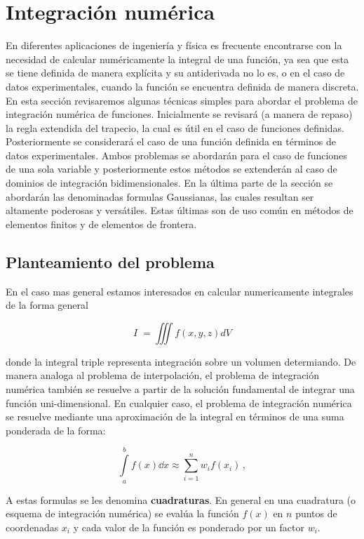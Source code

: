 \section{Integración numérica}
En diferentes aplicaciones de ingeniería y física es frecuente encontrarse con la necesidad de calcular numéricamente la integral de una función, ya sea que 
esta se tiene definida de manera explícita y su antiderivada no lo es, o en el caso de datos experimentales, cuando la función se encuentra definida de manera 
discreta.  En esta sección revisaremos algunas técnicas simples para abordar el problema de integración numérica de funciones. Inicialmente se revisará (a manera de repaso) la regla extendida del trapecio, la cual es  útil en el caso de funciones definidas. Posteriormente se considerará el caso de una función definida en términos de datos experimentales. Ambos problemas se abordarán para el caso de funciones de una sola variable y posteriormente estos métodos se extenderán al caso de dominios de integración bidimensionales. En la última parte de la sección se abordarán las denominadas formulas Gaussianas, las cuales resultan ser altamente poderosas y versátiles. Estas últimas son de uso común en métodos de elementos finitos y de elementos de frontera.

\subsection{Planteamiento del problema}
En el caso mas general estamos interesados en calcular numericamente integrales de la forma general

\begin{equation}
I\;=\iiint f(x,y,z)dV
\label{sample integral 2}
\end{equation}

donde la integral triple representa integración sobre un volumen determiando. De manera analoga al problema de interpolación, el problema de integración numérica también se resuelve a partir de la solución fundamental de integrar una función uni-dimensional. En cualquier caso, el problema de integración numérica se resuelve mediante una aproximación de la integral en términos de una suma ponderada de la forma:

\begin{equation}
\int\limits_a^b f(x) \dd{x}  \approx \sum\limits_{i=1}^n w_i f(x_i)\, ,
\label{eq:quadra}
\end{equation}

A estas formulas se les denomina {\bf cuadraturas}. En general en una cuadratura (o esquema de integración numérica) se evalúa la función $f(x)$ en $n$ puntos de coordenadas $x_i$ y cada valor de la función es ponderado por un factor $w_i$.


